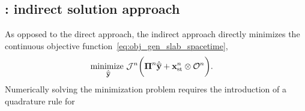 \subsection{\spaceTimeAcronym: indirect solution approach}
As opposed to the direct approach, the indirect approach directly minimizes the continuous objective function~\eqref{eq:obj_gen_slab_spacetime},
\begin{equation}\label{eq:obj_gen_slab2}
\begin{split}
 & \underset{\stgenstatey}{\text{minimize }} \mathcal{J}^n \bigg( \stbasisArgnt{n} \stgenstatey + \stateInterceptSTArg{n} \otimes \onesFunctionArg{n} \bigg) .%
\end{split} 
\end{equation}
Numerically solving the minimization problem requires the introduction of a quadrature rule for 
